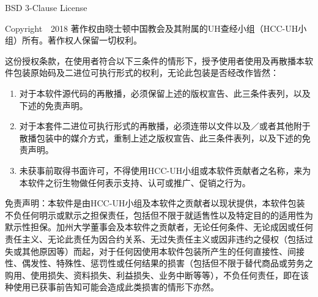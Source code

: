 \documentclass[Chinese,inNight]{CKBib}
\begin{document}
\clearpage

\begin{footnotesize}

\noindent BSD 3-Clause License

\vspace{1em}

\noindent Copyright~\textcopyright~2018 著作权由晓士顿中国教会及其附属的UH查经小组（HCC-UH小组）所有。著作权人保留一切权利。

\noindent 这份授权条款，在使用者符合以下三条件的情形下，授予使用者使用及再散播本软件包装原始码及二进位可执行形式的权利，无论此包装是否经改作皆然：

\begin{enumerate}
  \item 对于本软件源代码的再散播，必须保留上述的版权宣告、此三条件表列，以及下述的免责声明。
  \item 对于本套件二进位可执行形式的再散播，必须连带以文件以及／或者其他附于散播包装中的媒介方式，重制上述之版权宣告、此三条件表列，以及下述的免责声明。
  \item 未获事前取得书面许可，不得使用HCC-UH小组或本软件贡献者之名称，来为本软件之衍生物做任何表示支持、认可或推广、促销之行为。
\end{enumerate}

\noindent 免责声明：本软件是由HCC-UH小组及本软件之贡献者以现状提供，本软件包装不负任何明示或默示之担保责任，包括但不限于就适售性以及特定目的的适用性为默示性担保。加州大学董事会及本软件之贡献者，无论任何条件、无论成因或任何责任主义、无论此责任为因合约关系、无过失责任主义或因非违约之侵权（包括过失或其他原因等）而起，对于任何因使用本软件包装所产生的任何直接性、间接性、偶发性、特殊性、惩罚性或任何结果的损害（包括但不限于替代商品或劳务之购用、使用损失、资料损失、利益损失、业务中断等等），不负任何责任，即在该种使用已获事前告知可能会造成此类损害的情形下亦然。

\end{footnotesize}

\cleardoublepage
\end{document}
